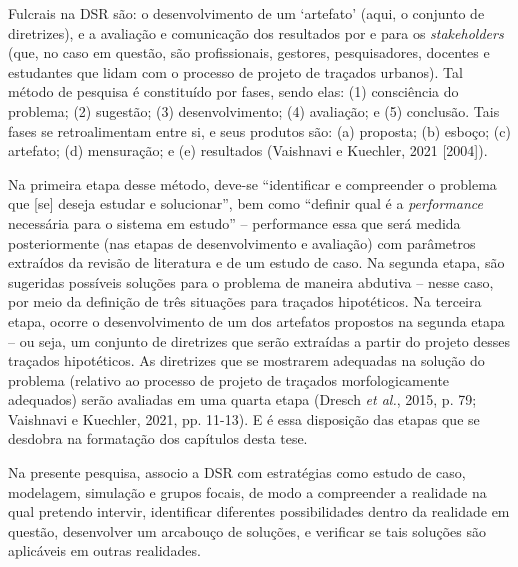 \documentclass[12pt, a4paper]{book} %
\begin{document}
        Fulcrais na DSR são: o desenvolvimento de um `artefato' (aqui, o conjunto de diretrizes), e a avaliação e comunicação dos resultados por e para os \textit{stakeholders} (que, no caso em questão, são profissionais, gestores, pesquisadores, docentes e estudantes que lidam com o processo de projeto de traçados urbanos). Tal método de pesquisa é constituído por fases, sendo elas: (1) consciência do problema; (2) sugestão; (3) desenvolvimento; (4) avaliação; e (5) conclusão. Tais fases se retroalimentam entre si, e seus produtos são: (a) proposta; (b) esboço; (c) artefato; (d) mensuração; e (e) resultados (Vaishnavi e Kuechler, 2021 [2004]).

        Na primeira etapa desse método, deve-se ``identificar e compreender o problema que [se] deseja estudar e solucionar'', bem como ``definir qual é a \textit{performance} necessária para o sistema em estudo'' – performance essa que será medida posteriormente (nas etapas de desenvolvimento e avaliação) com parâmetros extraídos da revisão de literatura e de um estudo de caso. Na segunda etapa, são sugeridas possíveis soluções para o problema de maneira abdutiva – nesse caso, por meio da definição de três situações para traçados hipotéticos. Na terceira etapa, ocorre o desenvolvimento de um dos artefatos propostos na segunda etapa – ou seja, um conjunto de diretrizes que serão extraídas a partir do projeto desses traçados hipotéticos. As diretrizes que se mostrarem adequadas na solução do problema (relativo ao processo de projeto de traçados morfologicamente adequados) serão avaliadas em uma quarta etapa (Dresch \textit{et al.}, 2015, p. 79; Vaishnavi e Kuechler, 2021, pp. 11-13). E é essa disposição das etapas que se desdobra na formatação dos capítulos desta tese.

        Na presente pesquisa, associo a DSR com estratégias como estudo de caso, modelagem, simulação e grupos focais, de modo a compreender a realidade na qual pretendo intervir, identificar diferentes possibilidades dentro da realidade em questão, desenvolver um arcabouço de soluções, e verificar se tais soluções são aplicáveis em outras realidades.
\end{document}
